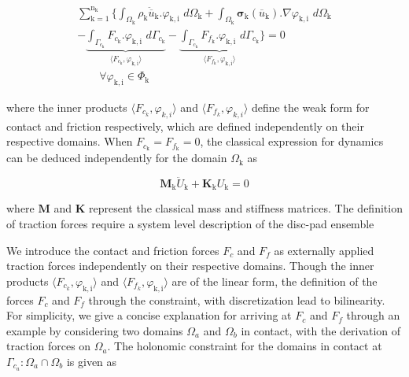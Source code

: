 \begin{multline}
\sum_{\mathrm{k}=1}^{\mathrm{n}_{\mathrm{\mathrm{k}}}}   \bigg\{\int_{\Omega_\mathrm{k}}\rho_\mathrm{k} \ddot{\overline{u}}_{\mathrm{k}}. \varphi_{\mathrm{k},\mathrm{i}} \,\, d\Omega_\mathrm{k}+\int_{\Omega_\mathrm{k}}\bm{\sigma}_\mathrm{k}(\overline{u}_{\mathrm{k}}).\nabla\varphi_{\mathrm{k},\mathrm{i}} \,\,d\Omega_\mathrm{k}\\
-\underbrace{\int_{\Gamma_{c_\mathrm{k}}}F_{c_\mathrm{k}}.\varphi_{\mathrm{k},\mathrm{i}}\,\,d\Gamma_{c_\mathrm{k}}}_{\langle F_{c_\mathrm{k}},\varphi_{\mathrm{k},\mathrm{i}} \rangle}- \underbrace{\int_{\Gamma_{c_\mathrm{k}}}F_{f_\mathrm{k}}.\varphi_{\mathrm{k},\mathrm{i}}\,\,d\Gamma_{c_\mathrm{k}}}_{\langle F_{f_\mathrm{k}},\varphi_{\mathrm{k},\mathrm{i}} \rangle}\bigg\} = 0 \\
\qquad \forall \varphi_{\mathrm{k},\mathrm{i}} \in \Phi_\mathrm{k} \label{cont3}
\end{multline}

where the inner products $\langle {F}_{c_k},\varphi_{k,i} \rangle$ and $\langle {F}_{f_k},\varphi_{k,i} \rangle$ define the weak form for contact and friction respectively, which are defined independently on their respective domains.
When $F_{c_\mathrm{k}}=F_{f_\mathrm{k}}=0$, the classical expression for dynamics can be deduced independently for the domain $\Omega_\mathrm{k}$ as

\begin{equation}
    \mathbf{M}_\mathrm{k}\ddot{U}_\mathrm{k}+\mathbf{K}_\mathrm{k}U_\mathrm{k}=0
\end{equation}

where $\mathbf{M}$ and $\mathbf{K}$ represent the classical mass and stiffness matrices. The definition of traction forces require a system level description of the disc-pad ensemble

We introduce the contact and friction forces $F_{c}$ and  $F_{f}$  as externally applied traction forces independently on their respective domains.  Though the inner products $\langle {F}_{c_k},\varphi_\mathrm{k,i} \rangle$ and $\langle {F}_{f_k},\varphi_{\mathrm{k},\mathrm{i}} \rangle$ are of the linear form, the definition of the forces $F_{c}$ and  $F_{f}$ through the constraint, with discretization lead to bilinearity. For simplicity, we give a concise explanation for arriving at $F_{c}$ and $F_{f}$ through an example by considering two domains $\Omega_a$ and $\Omega_b$ in contact, with the derivation of traction forces on $\Omega_a$. The holonomic constraint  for the domains in contact at $\Gamma_{c_a} : \Omega_a \cap \Omega_b$ is given as

